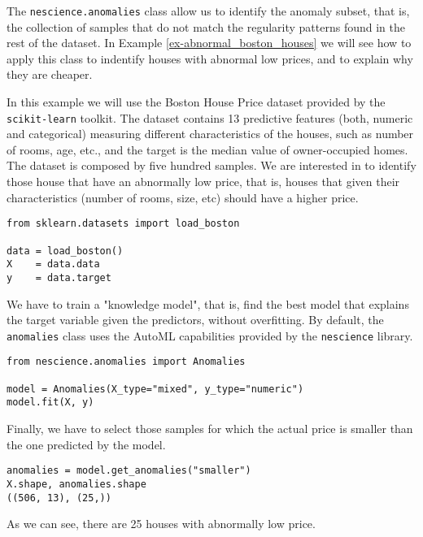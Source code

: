 The \texttt{nescience.anomalies} class allow us to identify the anomaly subset, that is, the collection of samples that do not match the regularity patterns found in the rest of the dataset. In Example \ref{ex-abnormal_boston_houses} we will see how to apply this class to indentify houses with abnormal low prices, and to explain why they are cheaper.

\begin{example}
\label{ex-abnormal_boston_houses}
In this example we will use the Boston House Price dataset provided by the \texttt{scikit-learn} toolkit. The dataset contains 13 predictive features (both, numeric and categorical) measuring different characteristics of the houses, such as number of rooms, age, etc., and the target is the median value of owner-occupied homes. The dataset is composed by five hundred samples. We are interested in to identify those house that have an abnormally low price, that is, houses that given their characteristics (number of rooms, size, etc) should have a higher price.

\begin{sourcecode}
{\scriptsize \begin{verbatim}
from sklearn.datasets import load_boston

data = load_boston()
X    = data.data
y    = data.target
\end{verbatim}}
\end{sourcecode}

We have to train a "knowledge model", that is, find the best model that explains the target variable given the predictors, without overfitting. By default, the \texttt{anomalies} class uses the AutoML capabilities provided by the \texttt{nescience} library.

\begin{sourcecode}
{\scriptsize \begin{verbatim}
from nescience.anomalies import Anomalies

model = Anomalies(X_type="mixed", y_type="numeric")
model.fit(X, y)
\end{verbatim}}
\end{sourcecode}

Finally, we have to select those samples for which the actual price is smaller than the one predicted by the model.

\begin{sourcecode}
{\scriptsize \begin{verbatim}
anomalies = model.get_anomalies("smaller")
X.shape, anomalies.shape
((506, 13), (25,))
\end{verbatim}}
\end{sourcecode}

As we can see, there are 25 houses with abnormally low price.
\end{example}

